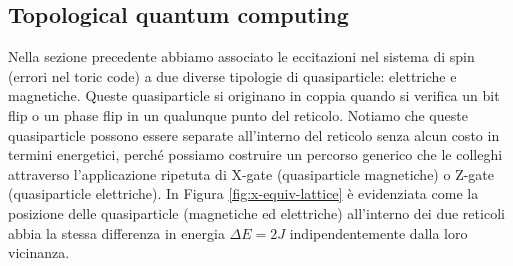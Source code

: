 \vspace{1cm}
\newline
{}
\subsection{Topological quantum computing}
Nella sezione precedente abbiamo associato le eccitazioni nel sistema di spin (errori nel toric code) a due diverse tipologie di quasiparticle:  elettriche e  magnetiche. Queste quasiparticle si originano in coppia quando si verifica un bit flip o un phase flip in un qualunque punto del reticolo. Notiamo che queste quasiparticle possono essere separate all'interno del reticolo senza alcun costo in termini energetici, perché possiamo costruire un percorso generico che le colleghi attraverso l'applicazione ripetuta di X-gate (quasiparticle magnetiche) o Z-gate (quasiparticle elettriche). In Figura \ref{fig:x-equiv-lattice} è evidenziata come la posizione delle quasiparticle (magnetiche ed elettriche) all'interno dei due reticoli abbia la stessa differenza in energia $\Delta E=2J$ indipendentemente dalla loro vicinanza.

